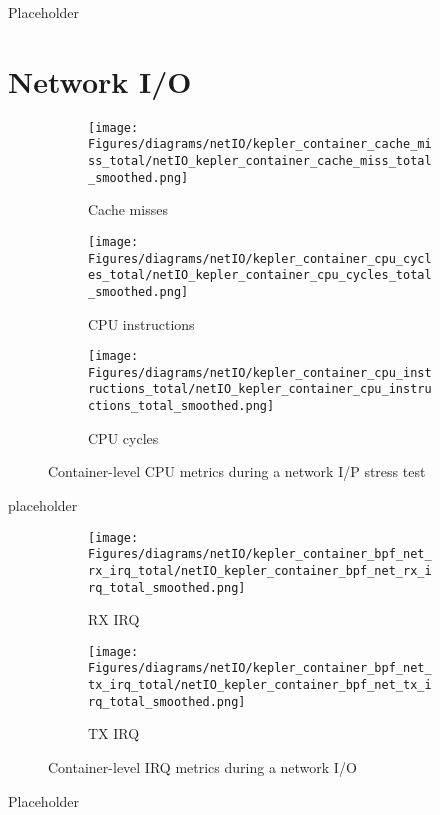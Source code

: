 Placeholder

\section{Network I/O}

\begin{figure}[H]
    \centering
    \begin{subfigure}{1\textwidth}
        \texttt{[image: Figures/diagrams/netIO/kepler\_container\_cache\_miss\_total/netIO\_kepler\_container\_cache\_miss\_total\_smoothed.png]}
        \caption{Cache misses}
    \end{subfigure}
    \begin{subfigure}{0.49\textwidth}
        \texttt{[image: Figures/diagrams/netIO/kepler\_container\_cpu\_cycles\_total/netIO\_kepler\_container\_cpu\_cycles\_total\_smoothed.png]}
        \caption{CPU instructions}
    \end{subfigure}
    \begin{subfigure}{0.49\textwidth}
        \texttt{[image: Figures/diagrams/netIO/kepler\_container\_cpu\_instructions\_total/netIO\_kepler\_container\_cpu\_instructions\_total\_smoothed.png]}
        \caption{CPU cycles}
    \end{subfigure}
    \caption{Container-level CPU metrics during a network I/P stress test}
\end{figure}

placeholder

\begin{figure}[H]
    \centering
    \begin{subfigure}{0.49\textwidth}
        \texttt{[image: Figures/diagrams/netIO/kepler\_container\_bpf\_net\_rx\_irq\_total/netIO\_kepler\_container\_bpf\_net\_rx\_irq\_total\_smoothed.png]}
        \caption{RX IRQ}
    \end{subfigure}
    \begin{subfigure}{0.49\textwidth}
        \texttt{[image: Figures/diagrams/netIO/kepler\_container\_bpf\_net\_tx\_irq\_total/netIO\_kepler\_container\_bpf\_net\_tx\_irq\_total\_smoothed.png]}
        \caption{TX IRQ}
    \end{subfigure}
    \caption{Container-level IRQ metrics during a network I/O}
\end{figure}

Placeholder
